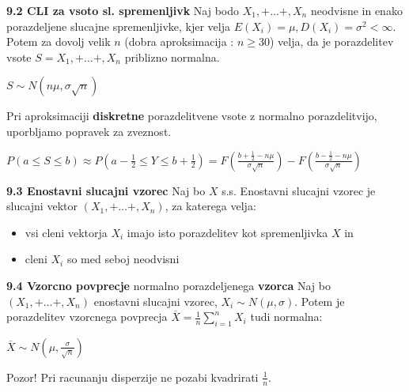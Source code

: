 \documentclass{article}
\begin{document}
\begin{multicols}{2}
	\textbf{9.2 CLI za vsoto sl. spremenljivk}
	Naj bodo $X_1, + \dots +, X_n$ neodvisne in enako porazdeljene
	slucajne spremenljivke, kjer velja $E(X_i) = \mu, D(X_i) = \sigma^2 < \infty$. Potem za
	dovolj velik $n$ (dobra aproksimacija : $n \geq 30$)  velja, da je porazdelitev vsote
	$S = X_1, + \dots +, X_n$ priblizno normalna.

	\begin{center}
		\begin{math}
			S \sim  N(n \mu, \sigma \sqrt{n})
		\end{math}
	\end{center}

	Pri aproksimaciji \textbf{diskretne} porazdelitvene vsote z normalno porazdelitvijo, uporbljamo
	popravek za zveznost.

	\begin{center}
		\begin{math}
			P(a \leq S \leq b) \approx P(a - \frac{1}{2} \leq Y \leq b + \frac{1}{2}) =
			F(
			\frac{b + \frac{1}{2} - n \mu}{\sigma \sqrt{n}}
			) -
			F(
			\frac{b - \frac{1}{2} - n \mu}{\sigma \sqrt{n}}
			)
		\end{math}
	\end{center}

	\textbf{9.3 Enostavni slucajni vzorec}
	Naj bo $X$ s.s. Enostavni slucajni vzorec je slucajni vektor $(X_1, + \dots +, X_n)$,
	za katerega velja:
	\begin{itemize}
		\item vsi cleni vektorja $X_i$ imajo isto porazdelitev kot spremenljivka $X$ in
		\item cleni $X_i$ so med seboj neodvisni
	\end{itemize}

	\textbf{9.4 Vzorcno povprecje} normalno porazdeljenega \textbf{vzorca}
	Naj bo  $(X_1, + \dots +, X_n)$ enostavni slucajni vzorec, $X_i \sim N(\mu, \sigma)$.
	Potem je porazdelitev vzorcnega povprecja $\overline{X} = \frac{1}{n} \sum_{i = 1}^{n} X_i$
	tudi normalna:
	\begin{center}
		\begin{math}
			\overline{X} \sim N(\mu, \frac{\sigma}{\sqrt{n}})
		\end{math}
	\end{center}

	Pozor! Pri racunanju disperzije ne pozabi kvadrirati \textbf{$\frac{1}{n}$}.


\end{multicols}
\end{document}
